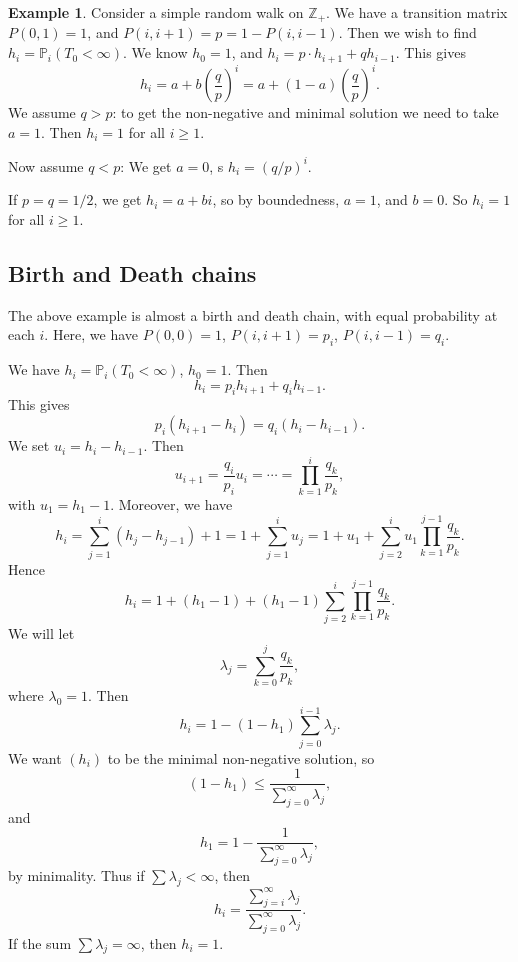 \documentclass[12pt]{article}
\theoremstyle{definition}
\newtheorem{example}{Example}[section]
\theoremstyle{remark}
\begin{document}
\begin{adjustbox}{minipage = \columnwidth - 25.5pt, margin=1em, frame=1pt, margin=0em}
\begin{example}
	Consider a simple random walk on $\mathbb{Z}_{+}$. We have a transition matrix $P(0, 1) = 1$, and $P(i, i+1) = p = 1 - P(i, i-1)$. Then we wish to find $h_i = \mathbb{P}_i(T_0 < \infty)$. We know $h_0 = 1$, and $h_i = p \cdot h_{i+1} + q h_{i-1}$. This gives
	\[
		h_i = a + b \left( \frac{q}{p} \right)^{i} = a + (1 - a) \left( \frac{q}{p} \right)^{i}
	.\]
	We assume $q > p$: to get the non-negative and minimal solution we need to take $a = 1$. Then $h_i = 1$ for all $i \geq 1$.

	Now assume $q < p$: We get $a = 0$, s $h_i = (q/p)^{i}$.

	If $p = q = 1/2$, we get $h_i = a + bi$, so by boundedness, $a = 1$, and $b = 0$. So $h_i = 1$ for all $i \geq 1$.
\end{example}

\end{adjustbox}

\subsection{Birth and Death chains}%
\label{sub:birth_and_death_chains}

The above example is almost a birth and death chain, with equal probability at each $i$. Here, we have $P(0, 0) = 1$, $P(i, i+1) = p_i$, $P(i, i-1) = q_i$.

We have $h_i = \mathbb{P}_i(T_0 < \infty)$, $h_0 = 1$. Then
\[
h_i = p_i h_{i+1} + q_i h_{i-1}
.\]
This gives
\[
	p_i (h_{i+1} - h_i) = q_i(h_{i} - h_{i-1})
.\]
We set $u_i = h_i - h_{i-1}$. Then
\[
u_{i+1} = \frac{q_i}{p_i} u_i = \cdots = \prod_{k = 1}^{i} \frac{q_k}{p_k}
,\]
with $u_1 = h_1 - 1$. Moreover, we have
\[
	h_i = \sum_{j = 1}^{i} (h_{j} - h_{j-1}) + 1 = 1 + \sum_{j = 1}^{i} u_j = 1 + u_1 + \sum_{j = 2}^{i} u_1 \prod_{k = 1}^{j-1} \frac{q_k}{p_k}
.\]
Hence
\[
	h_i = 1 + (h_1 - 1) + (h_1 - 1) \sum_{j = 2}^{i} \prod_{k = 1}^{j-1} \frac{q_k}{p_k}
.\]
We will let
\[
\lambda_j = \sum_{k = 0}^{j}\frac{q_k}{p_k}
,\]
where $\lambda_0 = 1$. Then
 \[
	 h_i = 1 - (1 - h_1) \sum_{j = 0}^{i-1} \lambda_j
.\]
We want $(h_i)$ to be the minimal non-negative solution, so
\[
	(1 - h_1) \leq \frac{1}{\sum_{j = 0}^{\infty} \lambda_j}
,\]
and
\[
h_1 = 1 - \frac{1}{\sum_{j = 0}^{\infty} \lambda_j}
,\]
by minimality. Thus if $\sum \lambda_j < \infty$, then
\[
h_i = \frac{\sum_{j = i}^{\infty} \lambda_j}{\sum_{j = 0}^{\infty} \lambda_j}
.\]
If the sum $\sum \lambda_j = \infty$, then $h_i = 1$.
\end{document}
